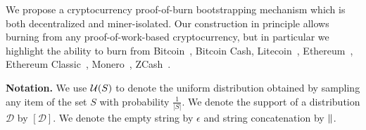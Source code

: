 We propose a cryptocurrency proof-of-burn bootstrapping mechanism which is both
decentralized and miner-isolated. Our construction in principle allows burning
from any proof-of-work-based cryptocurrency, but in particular we highlight the
ability to burn from Bitcoin~\cite{bitcoin},
Bitcoin Cash, Litecoin~\cite{lee2011litecoin},
Ethereum~\cite{buterin2014next,wood2014ethereum}, Ethereum
Classic~\cite{classic2017ethereum}, Monero~\cite{van2013cryptonote},
ZCash~\cite{SP:BCGGMT14,hopwood2016zcash}.

\noindent
\textbf{Notation.} We use $\mathcal{U}(S)$ to denote the uniform distribution
obtained by sampling any item of the set $S$ with probability $\frac{1}{|S|}$.
We denote the support of a distribution $\mathcal{D}$ by $[\mathcal{D}]$.
We denote the empty string by $\epsilon$ and string concatenation by $\mathbin{\|}$.
